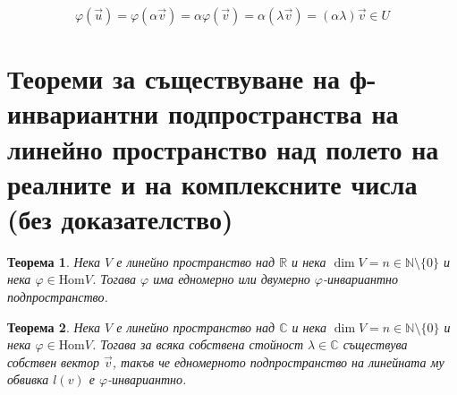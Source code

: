 \documentclass{scrartcl}
\newtheorem{theorem}{Теорема}
\begin{document}
\begin{FlushLeft}
$$\varphi(\vec{u}) = \varphi(\alpha \vec{v}) = \alpha\varphi(\vec{v}) = \alpha(\lambda\vec{v}) = (\alpha\lambda)\vec{v} \in U$$

\section{Теореми за съществуване на ф-инвариантни
подпространства на линейно пространство над полето на реалните и на комплексните числа (без доказателство)}

\begin{theorem}
Нека $V$ е линейно пространство над $\mathbb{R}$ и нека $\dim{V} = n \in \mathbb{N} \setminus \lbrace 0 \rbrace$ и нека $\varphi \in \text{Hom}{V}$. Тогава $\varphi$ има едномерно или двумерно $\varphi$-инвариантно подпространство.
\end{theorem}

\begin{theorem}
Нека $V$ е линейно пространство над $\mathbb{C}$ и нека $\dim{V} = n \in \mathbb{N} \setminus \lbrace 0 \rbrace$ и нека $\varphi \in \text{Hom}{V}$. Тогава за всяка собствена стойност $\lambda \in \mathbb{C}$ съществува собствен вектор $\vec{v}$, такъв че едномерното подпространство на линейната му обвивка $l(v)$ е $\varphi$-инвариантно.
\end{theorem}

\end{FlushLeft}
\end{document}
